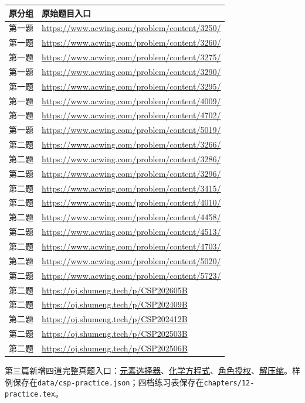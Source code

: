 \documentclass[UTF8,11pt,a4paper,fontset=none]{ctexart}
\begin{document}
\begin{longtable}{P{1.5cm}P{13.4cm}}
\toprule 原分组 & 原始题目入口 \\\midrule\endhead
第一题 & \url{https://www.acwing.com/problem/content/3250/}\\
第一题 & \url{https://www.acwing.com/problem/content/3260/}\\
第一题 & \url{https://www.acwing.com/problem/content/3275/}\\
第一题 & \url{https://www.acwing.com/problem/content/3290/}\\
第一题 & \url{https://www.acwing.com/problem/content/3295/}\\
第一题 & \url{https://www.acwing.com/problem/content/4009/}\\
第一题 & \url{https://www.acwing.com/problem/content/4702/}\\
第一题 & \url{https://www.acwing.com/problem/content/5019/}\\
第二题 & \url{https://www.acwing.com/problem/content/3266/}\\
第二题 & \url{https://www.acwing.com/problem/content/3286/}\\
第二题 & \url{https://www.acwing.com/problem/content/3296/}\\
第二题 & \url{https://www.acwing.com/problem/content/3415/}\\
第二题 & \url{https://www.acwing.com/problem/content/4010/}\\
第二题 & \url{https://www.acwing.com/problem/content/4458/}\\
第二题 & \url{https://www.acwing.com/problem/content/4513/}\\
第二题 & \url{https://www.acwing.com/problem/content/4703/}\\
第二题 & \url{https://www.acwing.com/problem/content/5020/}\\
第二题 & \url{https://www.acwing.com/problem/content/5723/}\\
第二题 & \url{https://oj.shumeng.tech/p/CSP202605B}\\
第二题 & \url{https://oj.shumeng.tech/p/CSP202409B}\\
第二题 & \url{https://oj.shumeng.tech/p/CSP202412B}\\
第二题 & \url{https://oj.shumeng.tech/p/CSP202503B}\\
第二题 & \url{https://oj.shumeng.tech/p/CSP202506B}\\
\bottomrule
\end{longtable}
第三篇新增四道完整真题入口：\href{https://oj.shumeng.tech/p/CSP201809C}{元素选择器}、\href{https://oj.shumeng.tech/p/CSP201912C}{化学方程式}、\href{https://oj.shumeng.tech/p/CSP202206C}{角色授权}、\href{https://oj.shumeng.tech/p/CSP202305C}{解压缩}。样例保存在\texttt{data/csp-practice.json}；四档练习表保存在\texttt{chapters/12-practice.tex}。
\end{document}
